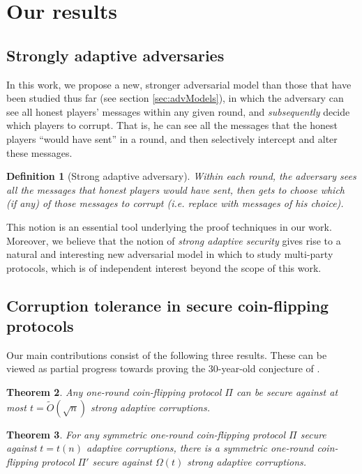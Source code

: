\documentclass[11pt,letterpaper]{article}
\theoremstyle{plain}
\newtheorem{theorem}{Theorem}[section]
\newtheorem{definition}[theorem]{Definition}
\theoremstyle{definition}
\begin{document}
\section{Our results}


\subsection{Strongly adaptive adversaries}

In this work, we propose a new, stronger adversarial model than those that have been studied thus far (see section \ref{sec:advModels}), 
in which the adversary can see all honest players' messages within any given round, 
and \emph{subsequently} decide which players to corrupt. That is, he can see all the messages that the honest players ``would have sent'' in a round,
and then selectively intercept and alter these messages.

\begin{definition}[Strong adaptive adversary]
Within each round, the adversary sees all the messages that honest players would have sent, 
then gets to choose which (if any) of those messages to corrupt (i.e. replace with messages of his choice).
\end{definition}

This notion is an essential tool underlying the proof techniques in our work.
Moreover, we believe that the notion of \emph{strong adaptive security} gives rise to a natural and interesting new adversarial model
in which to study multi-party protocols, which is of independent interest beyond the scope of this work.

\subsection{Corruption tolerance in secure coin-flipping protocols}

Our main contributions consist of the following three results.
These can be viewed as partial progress towards proving the 30-year-old conjecture of \cite{BL85}.

\begin{theorem}\label{thm:main}
Any one-round coin-flipping protocol $\Pi$ can be secure against at most $t=\widetilde{O}(\sqrt n)$ strong adaptive corruptions.
\end{theorem}

\begin{theorem}\label{thm:minmax}
For any symmetric one-round coin-flipping protocol $\Pi$ secure against $t=t(n)$ adaptive corruptions,
there is a symmetric one-round coin-flipping protocol $\Pi'$ secure against $\Omega(t)$ strong adaptive corruptions.
\end{theorem}
\end{document}
